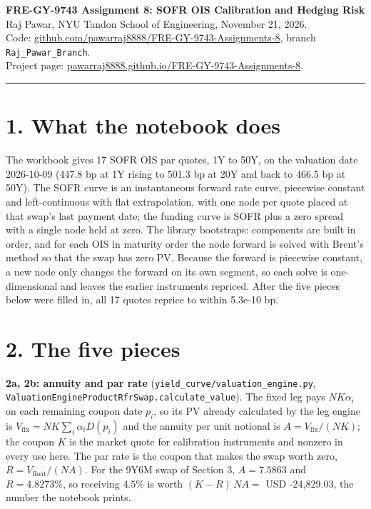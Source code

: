\documentclass[10pt]{article}
\newcommand{\code}[1]{\texttt{#1}}
\begin{document}
{\Large\bfseries FRE-GY-9743 Assignment 8: SOFR OIS Calibration and Hedging Risk}\\[1pt]
Raj Pawar, NYU Tandon School of Engineering, November 21, 2026.\\
Code: \href{https://github.com/pawarraj8888/FRE-GY-9743-Assignments-8/tree/Raj_Pawar_Branch}{github.com/pawarraj8888/FRE-GY-9743-Assignments-8}, branch \code{Raj\_Pawar\_Branch}.\\
Project page: \href{https://pawarraj8888.github.io/FRE-GY-9743-Assignments-8/}{pawarraj8888.github.io/FRE-GY-9743-Assignments-8}.
\vspace{2pt}\hrule

\section*{1. What the notebook does}
The workbook gives 17 SOFR OIS par quotes, 1Y to 50Y, on the valuation date 2026-10-09 (447.8 bp at 1Y rising to 501.3 bp at 20Y and
back to 466.5 bp at 50Y). The SOFR curve is an instantaneous forward rate curve, piecewise constant and left-continuous with flat
extrapolation, with one node per quote placed at that swap's last payment date; the funding curve is SOFR plus a zero spread with a
single node held at zero. The library bootstraps: components are built in order, and for each OIS in maturity order the node forward is
solved with Brent's method so that the swap has zero PV. Because the forward is piecewise constant, a new node only changes the forward
on its own segment, so each solve is one-dimensional and leaves the earlier instruments repriced. After the five pieces below were
filled in, all 17 quotes reprice to within 5.3e-10 bp.

\section*{2. The five pieces}
\textbf{2a, 2b: annuity and par rate} (\code{yield\_curve/valuation\_engine.py}, \code{ValuationEngineProductRfrSwap.calculate\_value}). The fixed leg pays $NK\alpha_i$ on each
remaining coupon date $p_i$, so its PV already calculated by the leg engine is $V_{\mathrm{fix}}=NK\sum_i\alpha_iD(p_i)$ and the annuity
per unit notional is $A=V_{\mathrm{fix}}/(NK)$; the coupon $K$ is the market quote for calibration instruments and nonzero in every
use here. The par rate is the coupon that makes the swap worth zero, $R=V_{\mathrm{float}}/(NA)$. For the 9Y6M swap of Section 3,
$A=7.5863$ and $R=4.8273\%$, so receiving $4.5\%$ is worth $(K-R)\,NA=$ USD -24,829.03, the number the notebook prints.
\end{document}
